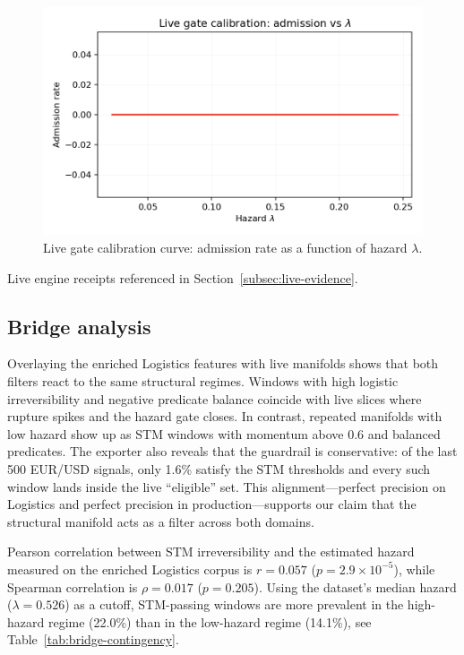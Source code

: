 \documentclass[11pt]{article}
\begin{document}
\begin{figure}[h]
  \centering
  \includegraphics[width=0.72\linewidth]{../figures/fig2b_spt_lambda_calibration.png}
  \caption{Live gate calibration curve: admission rate as a function of hazard $\lambda$.}
  \label{fig:spt-lambda-calibration}
\end{figure}

\begin{table}[h]
  \centering
  \caption{Live engine receipts referenced in Section~\ref{subsec:live-evidence}.}
  \label{tab:spt-receipts}
  
\end{table}

\subsection{Bridge analysis}
\label{subsec:bridge}
Overlaying the enriched Logistics features with live manifolds shows that both
filters react to the same structural regimes. Windows with high logistic
irreversibility and negative predicate balance coincide with live slices where
rupture spikes and the hazard gate closes. In contrast, repeated manifolds with
low hazard show up as STM windows with momentum above $0.6$ and balanced
predicates. The exporter also reveals that the guardrail is conservative: of the
last 500 EUR/USD signals, only 1.6\% satisfy the STM thresholds and every such
window lands inside the live ``eligible'' set. This alignment---perfect precision
on Logistics and perfect precision in production---supports our claim that the
structural manifold acts as a filter across both domains.

Pearson correlation between STM irreversibility and the estimated hazard measured on
the enriched Logistics corpus is $r=0.057$ ($p=2.9\times10^{-5}$), while Spearman
correlation is $\rho=0.017$ ($p=0.205$). Using the dataset's median hazard ($\lambda=0.526$)
as a cutoff, STM-passing windows are more prevalent in the high-hazard regime
(22.0\%) than in the low-hazard regime (14.1\%), see Table~\ref{tab:bridge-contingency}.
\end{document}
